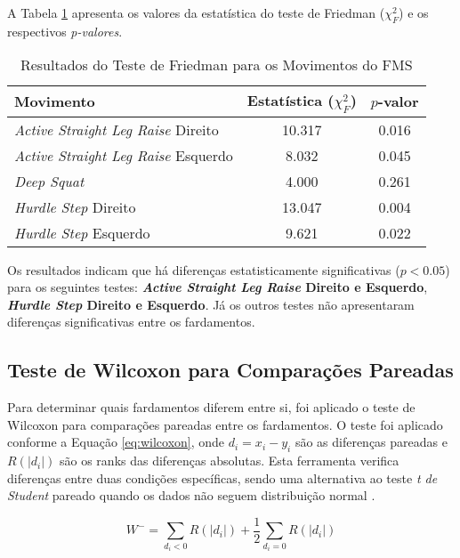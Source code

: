         A Tabela \ref{tab:friedman} apresenta os valores da estatística do teste de Friedman ($\chi^2_F$) e os respectivos \textit{p-valores}.

        \begin{table}[H]
            \centering
            \caption{Resultados do Teste de Friedman para os Movimentos do FMS}
            \label{tab:friedman}
            \begin{tabular}{lcc}
                \hline
                \textbf{Movimento} & \textbf{Estatística ($\chi^2_F$)} & \textbf{$p$-valor} \\
                \hline
                \textit{Active Straight Leg Raise} Direito  & 10.317 & 0.016  \\
                \textit{Active Straight Leg Raise} Esquerdo &  8.032 & 0.045  \\
                \textit{Deep Squat}                        &  4.000 & 0.261  \\
                \textit{Hurdle Step} Direito               & 13.047 & 0.004  \\
                \textit{Hurdle Step} Esquerdo              &  9.621 & 0.022  \\
                \hline
            \end{tabular}
            \end{table}

        Os resultados indicam que há diferenças estatisticamente significativas ($p < 0.05$) para os seguintes testes: \textbf{\textit{Active Straight Leg Raise} Direito e Esquerdo}, \textbf{\textit{Hurdle Step} Direito e Esquerdo}. Já os outros testes não apresentaram diferenças significativas entre os fardamentos.

    \subsection{Teste de Wilcoxon para Comparações Pareadas}
        Para determinar quais fardamentos diferem entre si, foi aplicado o teste de Wilcoxon para 
        comparações pareadas entre os fardamentos. O teste foi aplicado conforme a Equação \ref{eq:wilcoxon}, onde $d_i = x_i - y_i$ são as diferenças pareadas e $R(|d_i|)$ são os ranks das diferenças absolutas. 
        Esta ferramenta verifica diferenças entre duas condições específicas, sendo uma alternativa ao teste \textit{t de Student} pareado quando os dados não seguem distribuição normal \cite{azevedo2018metodos}.

    \begin{equation}
    W^- = \sum_{d_i < 0} R(|d_i|) + \frac{1}{2} \sum_{d_i = 0} R(|d_i|)
    \label{eq:wilcoxon}
    \end{equation}

